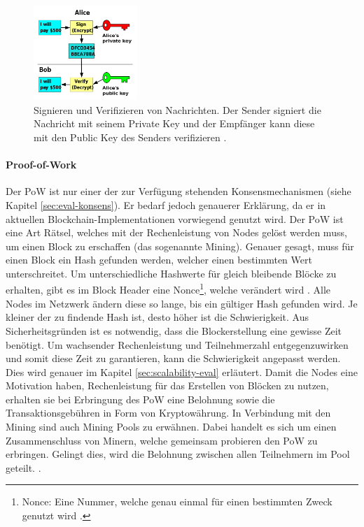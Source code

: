 \begin{figure}[!htbp]
	\centering
	  \includegraphics[width=0.35\textwidth,angle=0]{images/key-signing}
	  \caption{Signieren und Verifizieren von Nachrichten. Der Sender signiert die Nachricht mit seinem Private Key und der Empfänger kann diese mit den Public Key des Senders verifizieren \cite{WikimediaCommonsPublickeysigning2006}.}
	  \label{fig:key-signing}
\end{figure}
	
\paragraph{Proof-of-Work}
Der \acs{PoW} ist nur einer der zur Verfügung stehenden Konsensmechanismen (siehe Kapitel \ref{sec:eval-konsens}). Er bedarf jedoch genauerer Erklärung, da er in aktuellen Blockchain-Implementationen vorwiegend genutzt wird. Der \acs{PoW} ist eine Art Rätsel, welches mit der Rechenleistung von Nodes gelöst werden muss, um einen Block zu erschaffen (das sogenannte Mining). Genauer gesagt, muss für einen Block ein Hash gefunden werden, welcher einen bestimmten Wert unterschreitet. Um unterschiedliche Hashwerte für gleich bleibende Blöcke zu erhalten, gibt es im Block Header eine Nonce\footnote{Nonce: Eine Nummer, welche genau einmal für einen bestimmten Zweck genutzt wird \cite{MargaretNonceDefinition}.}, welche verändert wird \cite{NakamotoBitcoinPeertoPeerElectronic2008}. Alle Nodes im Netzwerk ändern diese so lange, bis ein gültiger Hash gefunden wird. Je kleiner der zu findende Hash ist, desto höher ist die Schwierigkeit. Aus Sicherheitsgründen ist es notwendig, dass die Blockerstellung eine gewisse Zeit benötigt. Um wachsender Rechenleistung und Teilnehmerzahl entgegenzuwirken und somit diese Zeit zu garantieren, kann die Schwierigkeit angepasst werden. Dies wird genauer im Kapitel \ref{sec:scalability-eval} erläutert. Damit die Nodes eine Motivation haben, Rechenleistung für das Erstellen von Blöcken zu nutzen, erhalten sie bei Erbringung des \acs{PoW} eine Belohnung sowie die Transaktionsgebühren in Form von Kryptowährung. In Verbindung mit den Mining sind auch Mining Pools zu erwähnen. Dabei handelt es sich um einen Zusammenschluss von Minern, welche gemeinsam probieren den \acs{PoW} zu erbringen. Gelingt dies, wird die Belohnung zwischen allen Teilnehmern im Pool geteilt.  \cite{NakamotoBitcoinPeertoPeerElectronic2008} \cite{EthereumTeamEthereumWhitePaper2017}. 

